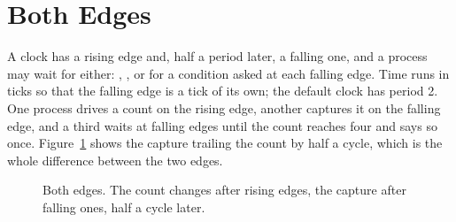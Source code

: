 \section{Both Edges}
\label{sec:x-edges}

A clock has a rising edge and, half a period later, a falling one,
and a process may wait for either: ,
, or  for a
condition asked at each falling edge. Time runs in ticks so that the
falling edge is a tick of its own; the default clock has period 2. One
process drives a count on the rising edge, another captures it on the
falling edge, and a third waits at falling edges until the count
reaches four and says so once. Figure~\ref{fig:x-edges} shows the
capture trailing the count by half a cycle, which is the whole
difference between the two edges.

\begin{figure}[htbp]
\centering

\caption{Both edges. The count changes after rising edges, the capture after falling ones, half a cycle later.}
\label{fig:x-edges}
\end{figure}





